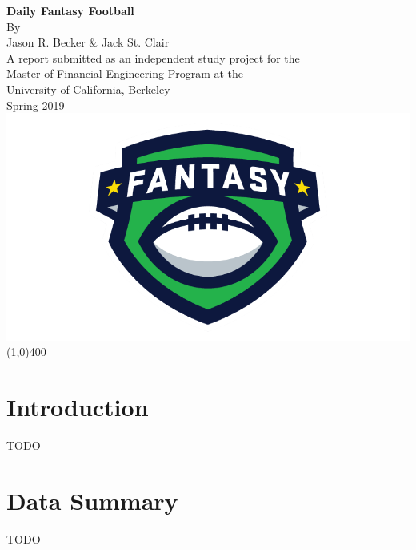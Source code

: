 \documentclass[12pt]{article}
\begin{document}
\begin{titlepage}
	\begin{center}
	\vspace*{4cm}
	\huge{\textbf{Daily Fantasy Football}}\\[2cm]
	\Large{By\\[2mm] Jason R. Becker \& Jack St. Clair}\\[2cm]
	\large{A report submitted as an independent study project for the\\
		Master of Financial Engineering Program at the\\
		 University of California, Berkeley}\\[1cm]	
	\Large{Spring 2019}\\[2cm]
	\includegraphics[scale=0.3]{../figures/fantasy_logo}
	\vfill
	\line(1,0){400}
	\end{center}
\end{titlepage}


\section{Introduction}
TODO



\pagebreak
\section{Data Summary}
TODO
\end{document}
